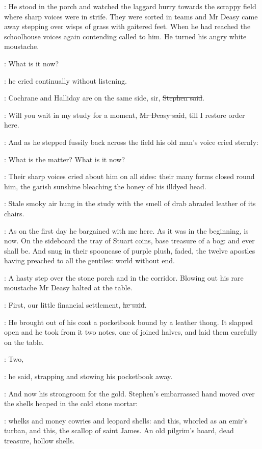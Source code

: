 :
He stood in the porch and watched the laggard hurry towards the scrappy field
where sharp voices were in strife.
They were sorted in teams
and Mr Deasy came away stepping over wisps of grass with gaitered feet.
When he had reached the schoolhouse
voices again contending called to him.
He turned his angry white moustache.

\deasy:
What is it now?

:
he cried continually without listening.

\Stephen:
Cochrane and Halliday are on the same side, sir, \sout{Stephen said}.

\deasy:
Will you wait in my study for a moment, \sout{Mr Deasy said},
till I restore order here.


:
And as he stepped fussily back across the field
his old man's voice cried sternly:

\deasy:
What is the matter?
What is it now?

:
Their sharp voices cried about him on all sides:
their many forms closed round him,
the garish sunshine bleaching the honey of his illdyed head.

:
Stale smoky air hung in the study
with the smell of drab abraded leather of its chairs.

\StephenInt:
As on the first day he bargained with me here.
As it was in the beginning, is now.
On the sideboard the tray of Stuart coins, base treasure of a bog:
and ever shall be.
And snug in their spooncase of purple plush, faded,
the twelve apostles having preached to all the gentiles:
world without end.

:
A hasty step over the stone porch and in the corridor.
Blowing out his rare moustache
Mr Deasy halted at the table.

\deasy:
First, our little financial settlement, \sout{he said}.

:
He brought out of his coat a pocketbook bound by a leather thong.
It slapped open and he took from it two notes, one of joined halves,
and laid them carefully on the table.

\deasy:
Two,

:
he said, strapping and stowing his pocketbook away.

:
And now his strongroom for the gold.
Stephen's embarrassed hand moved over the shells heaped in the cold stone mortar:

\StephenInt:
whelks and money cowries and leopard shells:
and this, whorled as an emir's turban,
and this, the scallop of saint James.
An old pilgrim's hoard, dead treasure, hollow shells.

